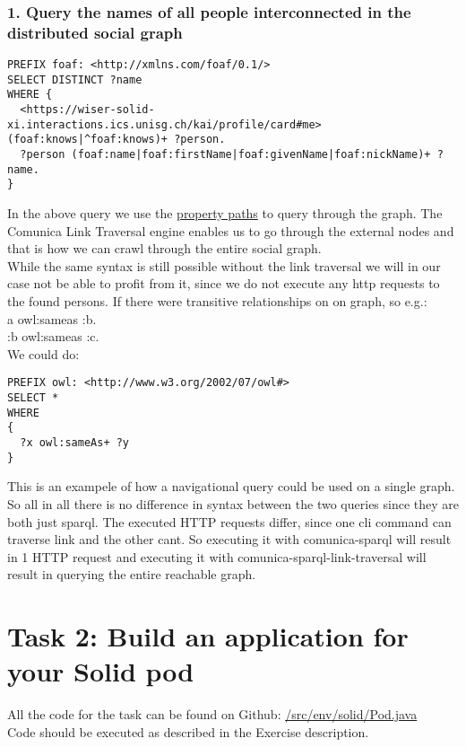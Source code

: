 \documentclass[11pt]{article}
\begin{document}
\subsubsection*{1. Query the names of all people interconnected in the distributed social graph}
\begin{lstlisting}
PREFIX foaf: <http://xmlns.com/foaf/0.1/>
SELECT DISTINCT ?name
WHERE {
  <https://wiser-solid-xi.interactions.ics.unisg.ch/kai/profile/card#me> (foaf:knows|^foaf:knows)+ ?person.
  ?person (foaf:name|foaf:firstName|foaf:givenName|foaf:nickName)+ ?name.
}
\end{lstlisting}
In the above query we use the \href{https://www.w3.org/TR/sparql11-query/\#propertypaths}{property paths} to query through the graph. The Comunica Link Traversal engine enables us to go through the external nodes and that is how we can crawl  through the entire social graph.\\
While the same syntax is still possible without the link traversal we will in our case not be able to profit from it, since we do not execute any http requests to the found persons. If there were transitive relationships on on graph, so e.g.:\\
a owl:sameas :b.\\
:b owl:sameas :c.\\
We could do:
\begin{lstlisting}
PREFIX owl: <http://www.w3.org/2002/07/owl#>
SELECT *
WHERE
{
  ?x owl:sameAs+ ?y
}
\end{lstlisting}
This is an exampele of how a navigational query could be used on a single graph. So all in all there is no difference in syntax between the two queries since they are both just sparql. The executed HTTP requests differ, since one cli command can traverse link and the other cant. So executing it with comunica-sparql will result in 1 HTTP request and executing it with comunica-sparql-link-traversal will result in querying the entire reachable graph.

\section*{Task 2: Build an application for your Solid pod}
All the code for the task can be found on Github: \href{https://github.com/KaiTries/exercise-4/blob/main/src/env/solid/Pod.java}{/src/env/solid/Pod.java}\\
Code should be executed as described in the Exercise  description.
\end{document}
